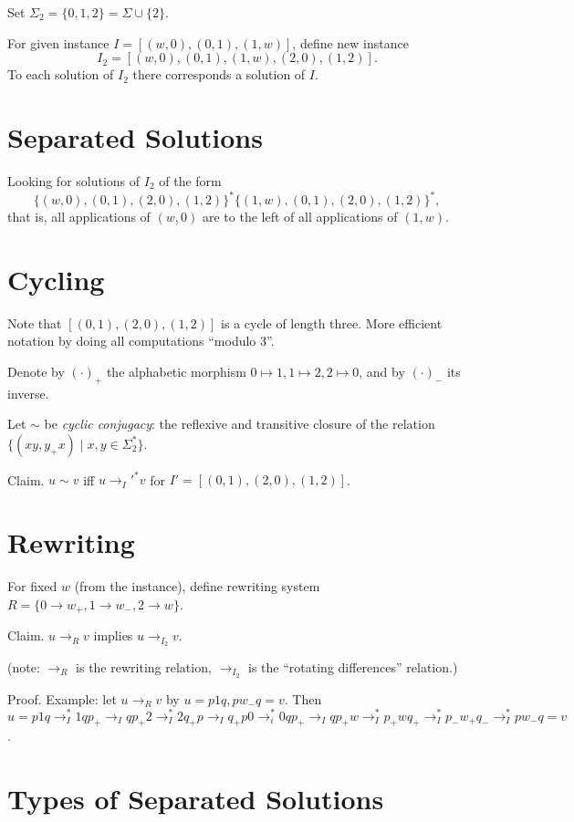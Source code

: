 \documentclass{llncs}
\begin{document}
Set $\Sigma_2 = \{0,1,2\} = \Sigma\cup\{2\}$.

For given instance $I=[(w,0),(0,1),(1,w)]$, define new instance
\[
  I_2 = [(w,0),(0,1),(1,w),(2,0),(1,2)].
\]
To each solution of $I_2$ there corresponds a solution of $I$.


\section{Separated Solutions}

Looking for solutions of $I_2$ of the form
\[
  \{ (w,0),(0,1),(2,0),(1,2) \}^*  \{ (1, w),(0,1),(2,0),(1,2) \}^*,
\]
that is, all applications of $(w,0)$ are to the left
of all applications of $(1,w)$.


\section{Cycling}

Note that $[(0,1),(2,0),(1,2)]$ is a cycle of length three.
More efficient notation by doing all computations ``modulo 3''.

Denote by $(\cdot)_+$ 
the alphabetic morphism $0 \mapsto 1, 1 \mapsto 2, 2 \mapsto 0$,
and by $(\cdot)_-$ its inverse.

Let $\sim$ be \emph{cyclic conjugacy}:
the reflexive and transitive closure of the relation
$\{ (xy, y_+x) \mid x,y\in\Sigma_2^* \}$.

Claim. $u \sim v$ iff $u \to_I'^* v$ for $I'=[(0,1),(2,0),(1,2)]$.

\section{Rewriting}

For fixed $w$ (from the instance),
define rewriting system $R = \{ 0 \to w_+, 1 \to w_-, 2 \to w \}$.

Claim. $u \to_R v$ implies $u \to_{I_2} v$.

(note: $\to_R$ is the rewriting relation,
$\to_{I_2}$ is the ``rotating differences'' relation.)

Proof. Example: let $u \to_R v$ by $u = p 1 q, p w_- q = v$.
Then $u = p 1 q \to_I^* 1 q p_+ \to_I q p_+ 2 \to_I^* 2 q_+ p
\to_I q_+ p 0 \to_i^* 0 q p_+ \to_I q p_+ w \to_I^* p_+ w q_+
\to_I^* p_- w_+ q_- \to_I^* p w_- q = v$.

\section{Types of Separated Solutions}
\end{document}

